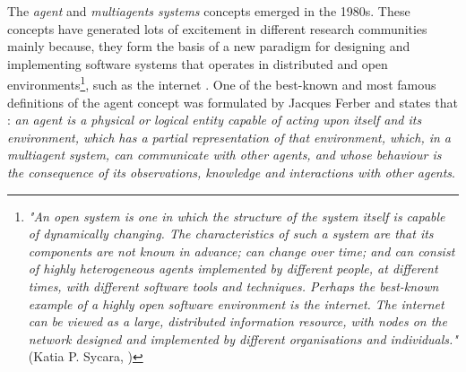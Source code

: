 \label{chap1:sec:agent-concept}
The \textit{agent} and \textit{multiagents systems} concepts emerged in the 1980s. These concepts have generated lots of excitement in different research communities mainly because, they form the basis of a new paradigm for designing and implementing software systems that operates in distributed and open environments\footnote{\textit{"An open system is one in which the structure of the system itself is capable of dynamically changing. The characteristics of such a system are that its components are not known in advance; can change over time; and can consist of highly heterogeneous agents implemented by different people, at different times, with different software tools and techniques. Perhaps the best-known example of a highly open software environment is the internet. The internet can be viewed as a large, distributed information resource, with nodes on the network designed and implemented by different organisations and individuals."} (Katia P. Sycara, \citeyearpar{sycara1998multiagent})}, such as the internet \cite{sycara1998multiagent}. One of the best-known and most famous definitions of the agent concept was formulated by Jacques Ferber \citeyearpar{ferber1997systemes} and states that : \textit{an agent is a physical or logical entity capable of acting upon itself and its environment, which has a partial representation of that environment, which, in a multiagent system, can communicate with other agents, and whose behaviour is the consequence of its observations, knowledge and interactions with other agents}.


